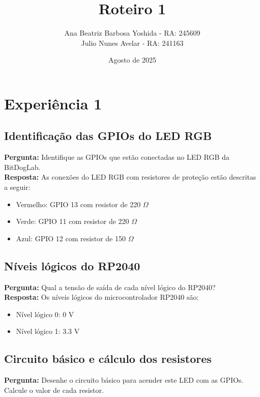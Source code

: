 \documentclass{article}
\title{Roteiro 1}
\author{Ana Beatriz Barbosa Yoshida - RA: 245609 \\ Julio Nunes Avelar - RA: 241163}
\date{Agosto de 2025}
\begin{document}
\maketitle

\tableofcontents
\newpage

\section{Experiência 1}

\subsection{Identificação das GPIOs do LED RGB}
\textbf{Pergunta:} Identifique as GPIOs que estão conectadas no LED RGB da BitDogLab. \\

\noindent
\textbf{Resposta:} As conexões do LED RGB com resistores de proteção estão descritas a seguir:  
\begin{itemize}
    \item Vermelho: GPIO 13 com resistor de 220 $\Omega$
    \item Verde: GPIO 11 com resistor de 220 $\Omega$
    \item Azul: GPIO 12 com resistor de 150 $\Omega$
\end{itemize}

\subsection{Níveis lógicos do RP2040}
\textbf{Pergunta:} Qual a tensão de saída de cada nível lógico do RP2040? \\

\noindent
\textbf{Resposta:} Os níveis lógicos do microcontrolador RP2040 são:  
\begin{itemize}
    \item Nível lógico 0: 0 V
    \item Nível lógico 1: 3.3 V
\end{itemize}

\subsection{Circuito básico e cálculo dos resistores}
\textbf{Pergunta:} Desenhe o circuito básico para acender este LED com as GPIOs. Calcule o valor de cada resistor. \\
\end{document}
